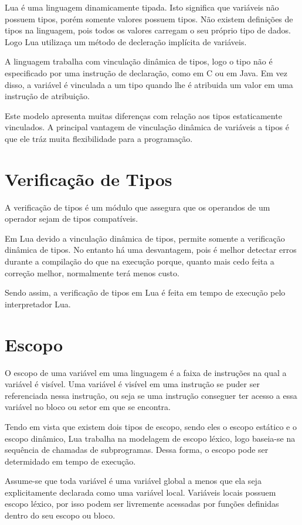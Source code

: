 \documentclass[
12pt, %
openright, %
oneside, %
a4paper, %
english, %
brazil, %
]{abntex2}
\begin{document}
Lua é uma linguagem dinamicamente tipada. Isto significa que variáveis não possuem tipos, porém somente valores possuem tipos. Não existem definições de tipos na linguagem, pois todos os valores carregam o seu próprio tipo de dados. Logo Lua utilizaça um método de decleração implícita de variáveis.

A linguagem trabalha com vinculação dinâmica de tipos, logo o tipo não é especificado por uma instrução de declaração, como em C ou em Java. Em vez disso, a variável é vinculada a um tipo quando lhe é atribuida um valor em uma instrução de atribuição.

Este modelo apresenta muitas diferenças com relação aos tipos estaticamente vinculados. A principal vantagem de vinculação dinâmica de variáveis a tipos é que ele tráz muita flexibilidade para a programação.

\section{Verificação de Tipos}
A verificação de tipos é um módulo que assegura que os operandos de um operador sejam de tipos compatíveis.

Em Lua devido a vinculação dinâmica de tipos, permite somente a verificação dinâmica de tipos. No entanto há uma desvantagem, pois é melhor detectar erros durante a compilação do que na execução porque, quanto mais cedo feita a correção melhor, normalmente terá menos custo.

Sendo assim, a verificação de tipos em Lua é feita em tempo de execução pelo interpretador Lua.

\section{Escopo}
O escopo de uma variável em uma linguagem é a faixa de instruções na qual a variável é visível. Uma variável é visível em uma instrução se puder ser referenciada nessa instrução, ou seja se uma instrução conseguer ter acesso a essa variável no bloco ou setor em que se encontra.

Tendo em vista que existem dois tipos de escopo, sendo eles o escopo estático e o escopo dinâmico, Lua trabalha na modelagem de escopo léxico, logo baseia-se na sequência de chamadas de subprogramas. Dessa forma, o escopo pode ser determidado em tempo de execução.

Assume-se que toda variável é uma variável global a menos que ela seja explicitamente declarada como uma variável local. Variáveis locais possuem escopo léxico, por isso podem ser livremente acessadas por funções definidas dentro do seu escopo ou bloco.
\end{document}

